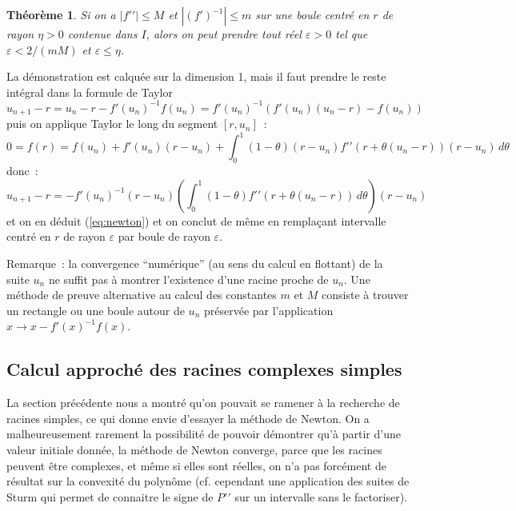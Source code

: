 \documentclass[a4paper,11pt]{article}
\newtheorem{thm}{Théorème}
\begin{document}
\begin{giacjshere}
\begin{thm}
Si on a $|f'{'}| \leq M$ et $|(f')^{-1}| \leq m$ sur une boule
centr\'e en $r$ de rayon $\eta>0$ contenue dans $I$, alors on peut prendre tout r\'eel
$\varepsilon>0$ tel que $\varepsilon < 2/(mM)$ et $\varepsilon \leq \eta$.
\end{thm}
La d\'emonstration est calqu\'ee sur la dimension 1, mais il faut
prendre le reste int\'egral dans la formule de Taylor
\[ u_{n+1}-r = u_n - r - f'(u_n)^{-1} f(u_n) = 
f'(u_n)^{-1} (f'(u_n)(u_n-r)-f(u_n) ) \]
puis on applique Taylor le long du segment $[r,u_n]$~:
\[ 0 = f(r)=f(u_n)+ f'(u_n) (r-u_n)+  \int_0^1 (1-\theta)(r-u_n)
f'{'}(r+\theta (u_n-r)) (r-u_n) \, d\theta \]
donc~:
$$u_{n+1}-r =-f'(u_n)^{-1}  (r-u_n) 
\left(\int_0^1 (1-\theta)f'{'}(r+\theta (u_n-r)) \, d\theta \right) (r-u_n)  $$
et on en d\'eduit (\ref{eq:newton}) et on conclut de m\^eme en
rempla\c{c}ant intervalle centr\'e en $r$ de rayon $\varepsilon$
par boule de rayon $\varepsilon$.

Remarque~: la convergence ``num\'erique'' (au sens du calcul en
flottant) de la suite $u_n$ ne suffit pas \`a montrer l'existence
d'une racine proche de $u_n$. Une m\'ethode de preuve alternative
au calcul des constantes $m$ et $M$ consiste
\`a trouver un rectangle ou une boule autour de $u_n$ pr\'eserv\'ee
par l'application $x\rightarrow x-f'(x)^{-1} f(x)$.



\subsection{Calcul approch\'e des racines complexes simples} 
  \label{sec:proot}
La section pr\'ec\'edente nous a montr\'e qu'on pouvait
se ramener \`a la recherche de racines simples, ce qui 
donne envie d'essayer la m\'ethode de Newton. On a malheureusement
rarement la possibilit\'e de pouvoir d\'emontrer qu'\`a partir d'une valeur
initiale donn\'ee, la m\'ethode de Newton converge, 
parce que les racines peuvent \^etre complexes, et m\^eme si elles
sont r\'eelles, on n'a pas forc\'ement de r\'esultat sur la convexit\'e
du polyn\^ome (cf. cependant une application des suites de
Sturm qui permet de connaitre le signe
de $P'{'}$ sur un intervalle sans le factoriser).


\end{giacjshere}
\end{document}
